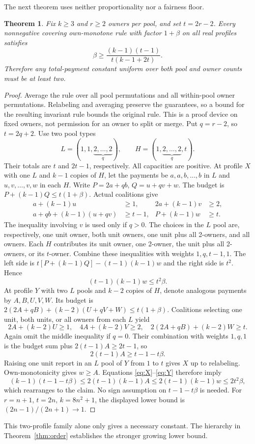 \documentclass[11pt]{article}
\newtheorem{theorem}{Theorem}[section]
\theoremstyle{definition}\newtheorem{definition}[theorem]{Definition}
\theoremstyle{remark}\newtheorem{remark}[theorem]{Remark}
\begin{document}
The next theorem uses neither proportionality nor a fairness floor.
\begin{theorem}\label{thm:unrestricted}
Fix $k\ge3$ and $r\ge2$ owners per pool, and set $t=2r-2$. Every
nonnegative covering own-monotone rule with factor $1+\beta$ on all real
profiles satisfies
\[
 \beta\ge\frac{(k-1)(t-1)}{t(k-1+2t)}.
\]
Therefore any total-payment constant uniform over both pool and owner counts
must be at least two.
\end{theorem}
\begin{proof}
Average the rule over all pool permutations and all within-pool owner
permutations. Relabeling and averaging preserve the guarantees, so a bound
for the resulting invariant rule bounds the original rule. This is a proof
device on fixed owners, not permission for an owner to split or merge.
Put $q=r-2$, so $t=2q+2$. Use two pool types
\[
 L=(1,1,\underbrace{2,\ldots,2}_{q}),\qquad
 H=(1,\underbrace{2,\ldots,2}_{q},t).
\]
Their totals are $t$ and $2t-1$, respectively. All capacities are positive.
At profile $X$ with one $L$ and $k-1$ copies of $H$, let the payments be
$a,a,b,\ldots,b$ in $L$ and $u,v,\ldots,v,w$ in each $H$. Write
$P=2a+qb$, $Q=u+qv+w$. The budget is $P+(k-1)Q\le t(1+\beta)$.
Actual coalitions give
\begin{align*}
 a+(k-1)u&\ge1, &2a+(k-1)v&\ge2,\\
 a+qb+(k-1)(u+qv)&\ge t-1, &P+(k-1)w&\ge t.
\end{align*}
The inequality involving $v$ is used only if $q>0$. The choices in the $L$ pool are,
respectively, one unit owner, both unit owners, one unit plus all 2-owners,
and all owners. Each $H$ contributes its unit owner, one 2-owner, the unit
plus all 2-owners, or its $t$-owner. Combine these inequalities with weights
$1,q,t-1,1$. The left side is
$t[P+(k-1)Q]-(t-1)(k-1)w$ and the right side is $t^2$. Hence
\begin{equation}\label{eq:X}
 (t-1)(k-1)w\le t^2\beta.
\end{equation}
At profile $Y$ with two $L$ pools and $k-2$ copies of $H$, denote analogous
payments by $A,B,U,V,W$. Its budget is
$2(2A+qB)+(k-2)(U+qV+W)\le t(1+\beta)$. Coalitions selecting one unit,
both units, or all owners from each $L$ yield
\[
 2A+(k-2)U\ge1,\quad4A+(k-2)V\ge2,\quad
 2(2A+qB)+(k-2)W\ge t.
\]
Again omit the middle inequality if $q=0$. Their combination with weights
$1,q,1$ is the budget sum plus $2(t-1)A\ge2t-1$, so
\begin{equation}\label{eq:Y}
 2(t-1)A\ge t-1-t\beta.
\end{equation}
Raising one unit report in an $L$ pool of $Y$ from $1$ to $t$ gives $X$
up to relabeling. Own-monotonicity gives $w\ge A$. Equations
\eqref{eq:X}--\eqref{eq:Y} therefore imply
\[
 (k-1)(t-1-t\beta)\le2(t-1)(k-1)A
 \le2(t-1)(k-1)w\le2t^2\beta,
\]
which rearranges to the claim. No sign assumption on $t-1-t\beta$ is needed.
For $r=n+1$, $t=2n$, $k=8n^2+1$, the displayed lower bound is
$(2n-1)/(2n+1)\to 1$.
\end{proof}
This two-profile family alone only gives a necessary constant. The hierarchy
in Theorem~\ref{thm:order} establishes the stronger growing lower bound.
\end{document}
